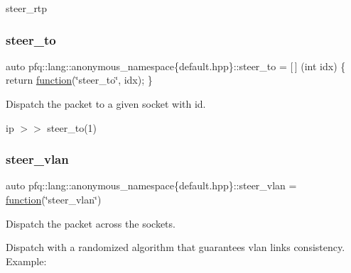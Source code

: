 steer\+\_\+rtp \mbox{\label{namespacepfq_1_1lang_1_1anonymous__namespace_02default_8hpp_03_a4980fea0af16a26df90f252b5ae21113}} 
\subsubsection{\texorpdfstring{steer\+\_\+to}{steer\_to}}
{\footnotesize\ttfamily auto pfq\+::lang\+::anonymous\+\_\+namespace\{default.\+hpp\}\+::steer\+\_\+to = \mbox{[}$\,$\mbox{]} (int idx) \{ return \hyperlink{namespacepfq_1_1lang_a1a4638059d700ae08d0ca63886ff2bb3}{function}(\char`\"{}steer\+\_\+to\char`\"{}, idx); \}}



Dispatch the packet to a given socket with id. 

ip $>$$>$ steer\+\_\+to(1) \mbox{\label{namespacepfq_1_1lang_1_1anonymous__namespace_02default_8hpp_03_a2c6a8ad5a3ae8b60a6a3d18a510f22ac}} 
\subsubsection{\texorpdfstring{steer\+\_\+vlan}{steer\_vlan}}
{\footnotesize\ttfamily auto pfq\+::lang\+::anonymous\+\_\+namespace\{default.\+hpp\}\+::steer\+\_\+vlan = \hyperlink{namespacepfq_1_1lang_a1a4638059d700ae08d0ca63886ff2bb3}{function}(\char`\"{}steer\+\_\+vlan\char`\"{})}



Dispatch the packet across the sockets. 

Dispatch with a randomized algorithm that guarantees vlan links consistency. Example\+:


